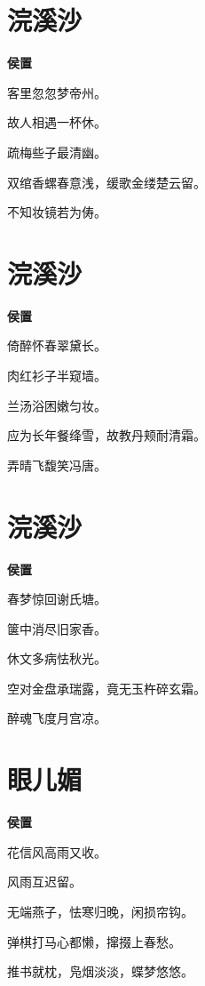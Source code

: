 \documentclass[12pt,a4paper]{ctexbook}
\begin{document}
\section{浣溪沙}
\textbf{侯置}\par\vspace{0.5em}
客里忽忽梦帝州。\par
故人相遇一杯休。\par
疏梅些子最清幽。\par
双绾香螺春意浅，缓歌金缕楚云留。\par
不知妆镜若为俦。\par

\section{浣溪沙}
\textbf{侯置}\par\vspace{0.5em}
倚醉怀春翠黛长。\par
肉红衫子半窥墙。\par
兰汤浴困嫩匀妆。\par
应为长年餐绛雪，故教丹颊耐清霜。\par
弄晴飞馥笑冯唐。\par

\section{浣溪沙}
\textbf{侯置}\par\vspace{0.5em}
春梦惊回谢氏塘。\par
箧中消尽旧家香。\par
休文多病怯秋光。\par
空对金盘承瑞露，竟无玉杵碎玄霜。\par
醉魂飞度月宫凉。\par

\section{眼儿媚}
\textbf{侯置}\par\vspace{0.5em}
花信风高雨又收。\par
风雨互迟留。\par
无端燕子，怯寒归晚，闲损帘钩。\par
弹棋打马心都懒，撺掇上春愁。\par
推书就枕，凫烟淡淡，蝶梦悠悠。\par
\end{document}

